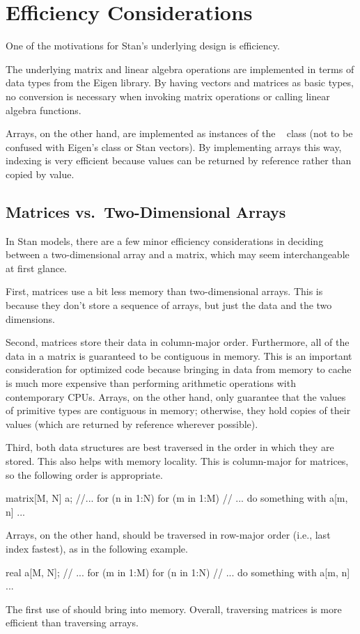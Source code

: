 \section{Efficiency Considerations}

One of the motivations for Stan's underlying design is efficiency.

The underlying matrix and linear algebra operations are implemented in
terms of data types from the Eigen \Cpp library.  By having vectors
and matrices as basic types, no conversion is necessary when invoking
matrix operations or calling linear algebra functions.  

Arrays, on the other hand, are implemented as instances of the \Cpp \ 
 class (not to be confused with Eigen's
 class or Stan vectors).  By implementing arrays
this way, indexing is very efficient because values can be returned by
reference rather than copied by value.

\subsection{Matrices vs.\ Two-Dimensional Arrays}

In Stan models, there are a few minor efficiency considerations in
deciding between a two-dimensional array and a matrix, which may seem
interchangeable at first glance.  

First, matrices use a bit less memory than two-dimensional arrays.
This is because they don't store a sequence of arrays, but just the
data and the two dimensions.  

Second, matrices store their data in column-major order.  Furthermore,
all of the data in a matrix is guaranteed to be contiguous in memory.
This is an important consideration for optimized code because bringing
in data from memory to cache is much more expensive than performing
arithmetic operations with contemporary CPUs.  Arrays, on the other
hand, only guarantee that the values of primitive types are contiguous
in memory; otherwise, they hold copies of their values (which are
returned by reference wherever possible).

Third, both data structures are best traversed in the order in which
they are stored.  This also helps with memory locality.  This is
column-major for matrices, so the following order is appropriate.
%
\begin{stancode}
matrix[M, N] a;
//...
for (n in 1:N)
  for (m in 1:M)
    // ... do something with a[m, n] ...
\end{stancode}
%
Arrays, on the other hand, should be traversed in row-major order
(i.e., last index fastest), as in the following example.
%
\begin{stancode}
real a[M, N];
// ...
for (m in 1:M)
  for (n in 1:N)
    // ... do something with a[m, n] ...
\end{stancode}
%
The first use of  should bring  into memory.
Overall, traversing matrices is more efficient than traversing arrays.

